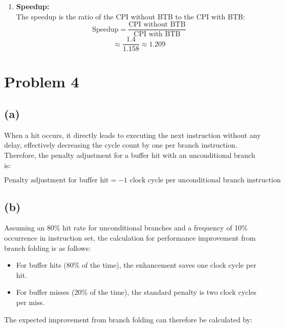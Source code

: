 \documentclass{article}
\begin{document}
\begin{enumerate}
  \item \textbf{Speedup:} \\
  The speedup is the ratio of the CPI without BTB to the CPI with BTB:
  \begin{equation*}
    \text{Speedup} = \frac{\text{CPI without BTB}}{\text{CPI with BTB}}
  \end{equation*}
  \begin{equation*}
    \approx \frac{1.4}{1.158} \approx 1.209
  \end{equation*}
\end{enumerate}

\section{Problem 4}

\subsection*{(a)}
When a hit occurs, it directly leads to executing the next instruction without any delay, effectively decreasing the cycle count by one per branch instruction. Therefore, the penalty adjustment for a buffer hit with an unconditional branch is:

\begin{equation*}
    \text{Penalty adjustment for buffer hit} = -1 \text{ clock cycle per unconditional branch instruction}
\end{equation*}

\subsection*{(b)}
Assuming an 80\% hit rate for unconditional branches and a frequency of 10\% occurrence in instruction set, the calculation for performance improvement from branch folding is as follows:

\begin{itemize}
  \item For buffer hits (80\% of the time), the enhancement saves one clock cycle per hit.
  \item For buffer misses (20\% of the time), the standard penalty is two clock cycles per miss.
\end{itemize}

The expected improvement from branch folding can therefore be calculated by:
\end{document}
